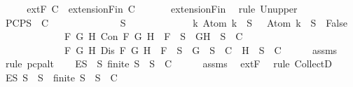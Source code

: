 \begin{isabellebody}
%
\isadelimproof
%
\endisadelimproof
%
\isatagproof
{}\isamarkupfalse%
\ {\isacharminus}\isanewline
\ \ \isamarkupfalse%
\ {\isachardoublequoteopen}{\isacharparenleft}extF\ C{\isacharparenright}\ {\isasymsubseteq}\ {\isacharparenleft}extensionFin\ C{\isacharparenright}{\isachardoublequoteclose}\ \isanewline
\ \ \ \ \isamarkupfalse%
\ extensionFin\ \isamarkupfalse%
\ {\isacharparenleft}rule\ Un{\isacharunderscore}upper{}{\isacharparenright}\ \isanewline
\ \ \isamarkupfalse%
\ PCP{\isacharcolon}{\isachardoublequoteopen}{\isasymforall}S\ {\isasymin}\ C{\isachardot}\isanewline
\ \ \ \ \ \ \ \ \ \ \ \ {\isasymbottom}\ {\isasymnotin}\ S\isanewline
\ \ \ \ \ \ \ \ \ \ \ \ {\isasymand}\ {\isacharparenleft}{\isasymforall}k{\isachardot}\ Atom\ k\ {\isasymin}\ S\ {\isasymlongrightarrow}\ \isactrlbold {\isasymnot}\ {\isacharparenleft}Atom\ k{\isacharparenright}\ {\isasymin}\ S\ {\isasymlongrightarrow}\ False{\isacharparenright}\isanewline
\ \ \ \ \ \ \ \ \ \ \ \ {\isasymand}\ {\isacharparenleft}{\isasymforall}F\ G\ H{\isachardot}\ Con\ F\ G\ H\ {\isasymlongrightarrow}\ F\ {\isasymin}\ S\ {\isasymlongrightarrow}\ {\isacharbraceleft}G{\isacharcomma}H{\isacharbraceright}\ {\isasymunion}\ S\ {\isasymin}\ C{\isacharparenright}\isanewline
\ \ \ \ \ \ \ \ \ \ \ \ {\isasymand}\ {\isacharparenleft}{\isasymforall}F\ G\ H{\isachardot}\ Dis\ F\ G\ H\ {\isasymlongrightarrow}\ F\ {\isasymin}\ S\ {\isasymlongrightarrow}\ {\isacharbraceleft}G{\isacharbraceright}\ {\isasymunion}\ S\ {\isasymin}\ C\ {\isasymor}\ {\isacharbraceleft}H{\isacharbraceright}\ {\isasymunion}\ S\ {\isasymin}\ C{\isacharparenright}{\isachardoublequoteclose}\isanewline
\ \ \ \ \isamarkupfalse%
\ assms{\isacharparenleft}{}{\isacharparenright}\ \isamarkupfalse%
\ {\isacharparenleft}rule\ pcp{\isacharunderscore}alt{}{\isacharparenright}\isanewline
\ \ \isamarkupfalse%
\ E{\isacharcolon}{\isachardoublequoteopen}{\isasymforall}S{\isacharprime}\ {\isasymsubseteq}\ S{\isachardot}\ finite\ S{\isacharprime}\ {\isasymlongrightarrow}\ S{\isacharprime}\ {\isasymin}\ C{\isachardoublequoteclose}\isanewline
\ \ \ \ \isamarkupfalse%
\ assms{\isacharparenleft}{}{\isacharparenright}\ \isamarkupfalse%
\ extF\ \isamarkupfalse%
\ {\isacharparenleft}rule\ CollectD{\isacharparenright}\isanewline
\ \ \isamarkupfalse%
\ \isamarkupfalse%
\ E{\isacharprime}{\isacharcolon}{\isachardoublequoteopen}{\isasymforall}S{\isacharprime}{\isachardot}\ S{\isacharprime}\ {\isasymsubseteq}\ S\ {\isasymlongrightarrow}\ finite\ S{\isacharprime}\ {\isasymlongrightarrow}\ S{\isacharprime}\ {\isasymin}\ C{\isachardoublequoteclose}\isanewline

\end{isabellebody}
